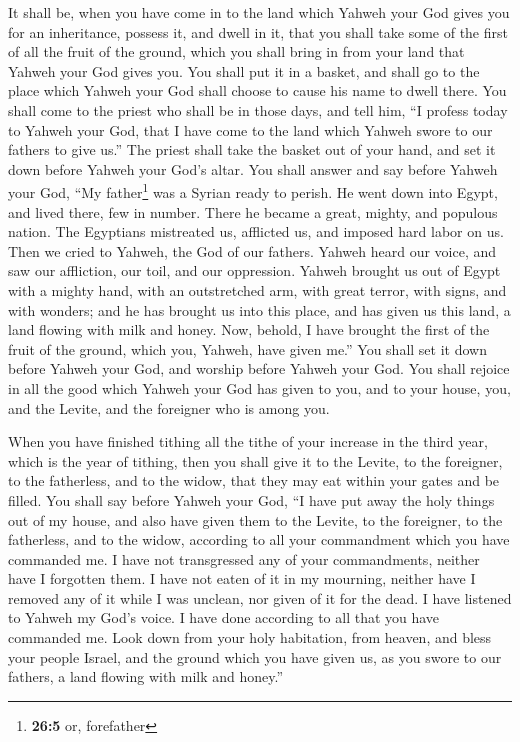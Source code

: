  It shall be, when you have come in to the land which
Yahweh your God gives you for an inheritance, possess it, and dwell in
it,  that you shall take some of the first of all the
fruit of the ground, which you shall bring in from your land that Yahweh
your God gives you. You shall put it in a basket, and shall go to the
place which Yahweh your God shall choose to cause his name to dwell
there.  You shall come to the priest who shall be in those
days, and tell him, ``I profess today to Yahweh your God, that I have
come to the land which Yahweh swore to our fathers to give us.''
 The priest shall take the basket out of your hand, and
set it down before Yahweh your God's altar.  You shall
answer and say before Yahweh your God, ``My father\footnote{\textbf{26:5}
  or, forefather} was a Syrian ready to perish. He went down into Egypt,
and lived there, few in number. There he became a great, mighty, and
populous nation.  The Egyptians mistreated us, afflicted
us, and imposed hard labor on us.  Then we cried to
Yahweh, the God of our fathers. Yahweh heard our voice, and saw our
affliction, our toil, and our oppression.  Yahweh brought
us out of Egypt with a mighty hand, with an outstretched arm, with great
terror, with signs, and with wonders;  and he has brought
us into this place, and has given us this land, a land flowing with milk
and honey.  Now, behold, I have brought the first of the
fruit of the ground, which you, Yahweh, have given me.'' You shall set
it down before Yahweh your God, and worship before Yahweh your God.
 You shall rejoice in all the good which Yahweh your God
has given to you, and to your house, you, and the Levite, and the
foreigner who is among you.

 When you have finished tithing all the tithe of your
increase in the third year, which is the year of tithing, then you shall
give it to the Levite, to the foreigner, to the fatherless, and to the
widow, that they may eat within your gates and be filled.
 You shall say before Yahweh your God, ``I have put away
the holy things out of my house, and also have given them to the Levite,
to the foreigner, to the fatherless, and to the widow, according to all
your commandment which you have commanded me. I have not transgressed
any of your commandments, neither have I forgotten them. 
I have not eaten of it in my mourning, neither have I removed any of it
while I was unclean, nor given of it for the dead. I have listened to
Yahweh my God's voice. I have done according to all that you have
commanded me.  Look down from your holy habitation, from
heaven, and bless your people Israel, and the ground which you have
given us, as you swore to our fathers, a land flowing with milk and
honey.''

